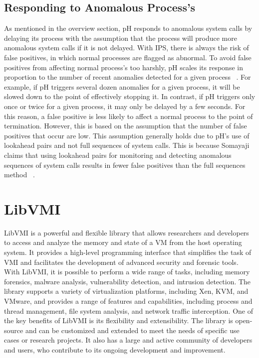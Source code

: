 \documentclass{report}
\begin{document}
\begin{spacing}{1.5}
\subsection{Responding to Anomalous Process's}


{\large
As mentioned in the overview section, pH responds to anomalous system calls by delaying its process with the assumption that the process will produce more anomalous system calls if it is not delayed. With IPS, there is always the risk of false positives, in which normal processes are flagged as abnormal. To avoid false positives from affecting normal process's too harshly, pH scales its response in proportion to the number of recent anomalies detected for a given process ~\cite{findlay2021practical}. For example, if pH triggers several dozen anomalies for a given process, it will be slowed down to the point of effectively stopping it. In contrast, if pH triggers only once or twice for a given process, it may only be delayed by a few seconds. For this reason, a false positive is less likely to affect a normal process to the point of termination. However, this is based on the assumption that the number of false positives that occur are low. This assumption generally holds due to pH's use of lookahead pairs and not full sequences of system calls. This is because Somayaji claims that using lookahead pairs for monitoring and detecting anomalous sequences of system calls results in fewer false positives than the full sequences method ~\cite{findlay2021practical}.
\leavevmode\newline
}




\section{LibVMI}
{\large
LibVMI is a powerful and flexible library that allows researchers and developers to access and analyze the memory and state of a VM from the host operating system. It provides a high-level programming interface that simplifies the task of VMI and facilitates the development of advanced security and forensic tools. With LibVMI, it is possible to perform a wide range of tasks, including memory forensics, malware analysis, vulnerability detection, and intrusion detection. The library supports a variety of virtualization platforms, including Xen, KVM, and VMware, and provides a range of features and capabilities, including process and thread management, file system analysis, and network traffic interception. One of the key benefits of LibVMI is its flexibility and extensibility. The library is open-source and can be customized and extended to meet the needs of specific use cases or research projects. It also has a large and active community of developers and users, who contribute to its ongoing development and improvement.
\newline    
}


\end{spacing}
\end{document}
